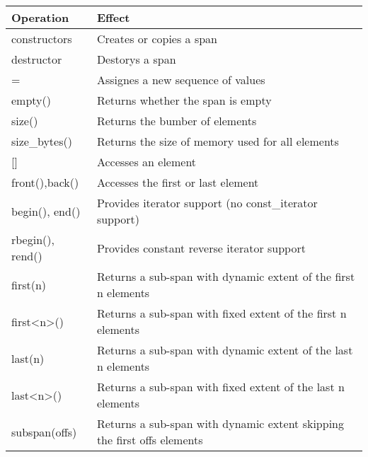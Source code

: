 \begin{longtable}[c]{|l|l|}
\hline
\textbf{Operation} & \textbf{Effect}                                                      \\ \hline
\endfirsthead
%
\endhead
%
constructors       & Creates or copies a span                                             \\ \hline
destructor         & Destorys a span                                                      \\ \hline
=                  & Assignes a new sequence of values                                    \\ \hline
empty()            & Returns whether the span is empty                                    \\ \hline
size()             & Returns the bumber of elements                                       \\ \hline
size\_bytes()      & Returns the size of memory used for all elements                     \\ \hline
{[}{]}             & Accesses an element                                                  \\ \hline
front(),back()     & Accesses the first or last element                                   \\ \hline
begin(), end()     & Provides iterator support (no const\_iterator support)               \\ \hline
rbegin(), rend()   & Provides constant reverse iterator support                           \\ \hline
first(n)           & Returns a sub-span with dynamic extent of the first n elements       \\ \hline
first\textless{}n\textgreater{}()         & Returns a sub-span with fixed extent of the first n elements            \\ \hline
last(n)            & Returns a sub-span with dynamic extent of the last n elements        \\ \hline
last\textless{}n\textgreater{}()          & Returns a sub-span with fixed extent of the last n elements             \\ \hline
subspan(offs)                             & Returns a sub-span with dynamic extent skipping the first offs elements \\ \hline

\end{longtable}
